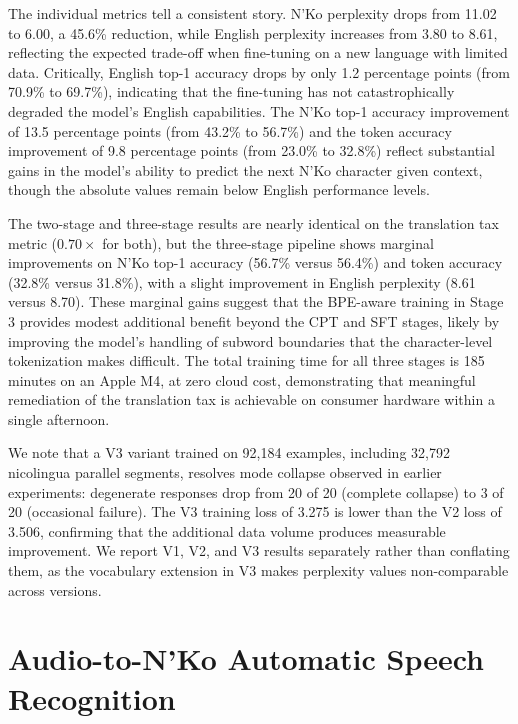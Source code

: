 \documentclass[11pt]{article}
\newcommand{\nko}{N'Ko}
\begin{document}
The individual metrics tell a consistent story. \nko{} perplexity drops from 11.02 to 6.00, a 45.6\% reduction, while English perplexity increases from 3.80 to 8.61, reflecting the expected trade-off when fine-tuning on a new language with limited data. Critically, English top-1 accuracy drops by only 1.2 percentage points (from 70.9\% to 69.7\%), indicating that the fine-tuning has not catastrophically degraded the model's English capabilities. The \nko{} top-1 accuracy improvement of 13.5 percentage points (from 43.2\% to 56.7\%) and the token accuracy improvement of 9.8 percentage points (from 23.0\% to 32.8\%) reflect substantial gains in the model's ability to predict the next \nko{} character given context, though the absolute values remain below English performance levels.

The two-stage and three-stage results are nearly identical on the translation tax metric ($0.70\times$ for both), but the three-stage pipeline shows marginal improvements on \nko{} top-1 accuracy (56.7\% versus 56.4\%) and token accuracy (32.8\% versus 31.8\%), with a slight improvement in English perplexity (8.61 versus 8.70). These marginal gains suggest that the BPE-aware training in Stage 3 provides modest additional benefit beyond the CPT and SFT stages, likely by improving the model's handling of subword boundaries that the character-level tokenization makes difficult. The total training time for all three stages is 185 minutes on an Apple M4, at zero cloud cost, demonstrating that meaningful remediation of the translation tax is achievable on consumer hardware within a single afternoon.

We note that a V3 variant trained on 92,184 examples, including 32,792 nicolingua parallel segments, resolves mode collapse observed in earlier experiments: degenerate responses drop from 20 of 20 (complete collapse) to 3 of 20 (occasional failure). The V3 training loss of 3.275 is lower than the V2 loss of 3.506, confirming that the additional data volume produces measurable improvement. We report V1, V2, and V3 results separately rather than conflating them, as the vocabulary extension in V3 makes perplexity values non-comparable across versions.

\section{Audio-to-\nko{} Automatic Speech Recognition}
\label{sec:asr}
\end{document}
